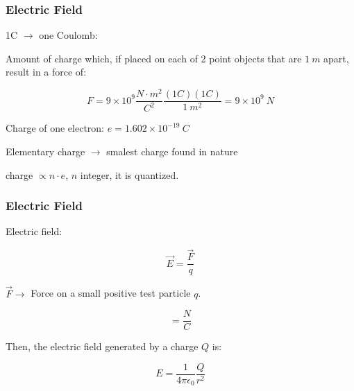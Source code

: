 \documentclass[]{beamer}
\begin{document}



\begin{frame}
\frametitle{Electric Field}

1C $\rightarrow$ one Coulomb:

\vspace{3mm}
\pause

Amount of charge which, if placed on each of 2 point objects that are $1~m$ apart, result in a force of:


\vspace{3mm}
\pause

\begin{equation}
F=9\times 10^9 \frac{N\cdot m^2}{C^2}\frac{(1C)(1C)}{1~m^2}=9\times10^9~N
\end{equation}

\vspace{3mm}
\pause

Charge of one electron: $e=1.602\times 10^{-19}~C$

\vspace{3mm}
\pause

Elementary charge $\rightarrow$ smalest charge found in nature
\vspace{3mm}
\pause

charge $\propto n\cdot e$, $n$ integer, it is quantized.
  \end{frame}





\begin{frame}
\frametitle{Electric Field}

Electric field:

\begin{equation}
\vec{E}=\frac{\vec{F}}{q}
\end{equation}

\pause
\vspace{3mm}

$\vec{F}\rightarrow$ Force on a small positive test particle $q$.
\pause
\vspace{3mm}

\begin{equation}
[E]=\frac{N}{C}
\end{equation}
\pause
\vspace{3mm}

Then, the electric field generated by a charge $Q$ is:

\begin{equation}
E=\frac{1}{4\pi\epsilon_0}\frac{Q}{r^2}
\end{equation}


  \end{frame}
\end{document}
